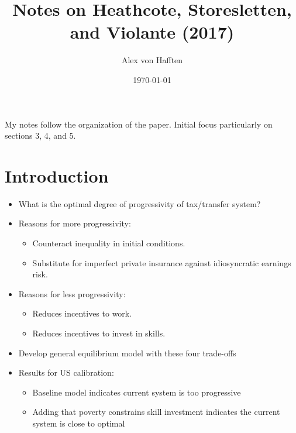 \documentclass{article}
\title{Notes on Heathcote, Storesletten, and Violante (2017)}
\author{Alex von Hafften}
\date{\today}
\begin{document}
\maketitle

My notes follow the organization of the paper. Initial focus particularly on sections 3, 4, and 5.

\section{Introduction}

\begin{itemize}

\item What is the optimal degree of progressivity of tax/transfer system?

\item Reasons for more progressivity:

\begin{itemize}

\item Counteract inequality in initial conditions.

\item Substitute for imperfect private insurance against idiosyncratic earnings risk.

\end{itemize}

\item Reasons for less progressivity:

\begin{itemize}

\item Reduces incentives to work.

\item Reduces incentives to invest in skills.

\end{itemize}

\item Develop general equilibrium model with these four trade-offs

\item Results for US calibration:

\begin{itemize}

\item Baseline model indicates current system is too progressive

\item Adding that poverty constrains skill investment indicates the current system is close to optimal

\end{itemize}

\end{itemize}
\end{document}
